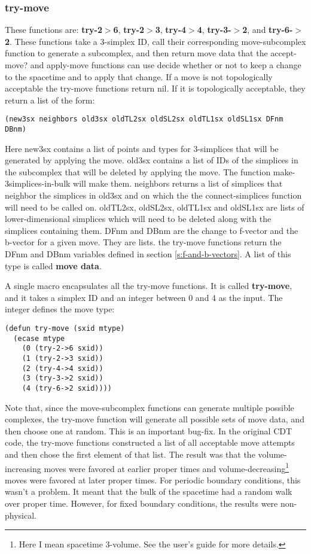 \documentclass[12pt]{article}
\begin{document}
\subsubsection{try-move}

These functions are: \textbf{try-2$>$6}, \textbf{try-2$>$3},
\textbf{try-4$>$4}, \textbf{try-3-$>$2}, and
\textbf{try-6-$>$2}. These functions take a 3-simplex ID, call their
corresponding move-subcomplex function to generate a subcomplex, and
then return move data that the accept-move? and apply-move functions
can use decide whether or not to keep a change to the spacetime and to
apply that change. If a move is not topologically acceptable the
try-move functions return nil. If it is topologically acceptable, they
return a list of the form:
\begin{small}
\begin{lstlisting}
(new3sx neighbors old3sx oldTL2sx oldSL2sx oldTL1sx oldSL1sx DFnm DBnm)
\end{lstlisting}
\end{small}
Here new3sx contains a list of points and types for 3-simplices that
will be generated by applying the move. old3sx contains a list of IDs
of the simplices in the subcomplex that will be deleted by applying
the move. The function make-3simplices-in-bulk will make
them. neighbors returns a list of simplices that neighbor the
simplices in old3sx and on which the the connect-simplices function
will need to be called on. oldTL2sx, oldSL2sx, oldTL1sx and oldSL1sx
are lists of lower-dimensional simplices which will need to be deleted
along with the simplices containing them. DFnm and DBnm are the change
to f-vector and the b-vector for a given move. They are lists. the
try-move functions return the DFnm and DBnm variables defined in
section \ref{s:f-and-b-vectors}. A list of this type is called
\textbf{move data}.

A single macro encapsulates all the try-move functions. It is called
\textbf{try-move}, and it takes a simplex ID and an integer between 0
and 4 as the input. The integer defines the move type:
\begin{lstlisting}
(defun try-move (sxid mtype)
  (ecase mtype
    (0 (try-2->6 sxid))
    (1 (try-2->3 sxid))
    (2 (try-4->4 sxid))
    (3 (try-3->2 sxid))
    (4 (try-6->2 sxid))))
\end{lstlisting}

Note that, since the move-subcomplex functions can generate multiple
possible complexes, the try-move function will generate all possible
sets of move data, and then choose one at random. This is an important
bug-fix. In the original CDT code, the try-move functions constructed
a list of all acceptable move attempts and then chose the first
element of that list. The result was that the volume-increasing moves
were favored at earlier proper times and
volume-decreasing\footnote{Here I mean spacetime 3-volume. See the
  user's guide for more details.} moves were favored at later proper
times. For periodic boundary conditions, this wasn't a problem. It
meant that the bulk of the spacetime had a random walk over proper
time. However, for fixed boundary conditions, the results were
non-physical.
\end{document}
